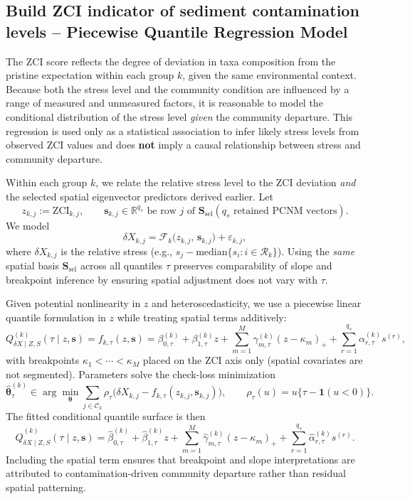 \subsection{Build ZCI indicator of sediment contamination levels – Piecewise Quantile Regression Model}

The $\mathrm{ZCI}$ score reflects the degree of deviation in taxa composition from the pristine expectation within each group $k$, given the same environmental context. 
Because both the stress level and the community condition are influenced by a range of measured and unmeasured factors, it is reasonable to model the conditional distribution of the stress level \emph{given} the community departure.  
This regression is used only as a statistical association to infer likely stress levels from observed $\mathrm{ZCI}$ values and does \textbf{not} imply a causal relationship between stress and community departure.

Within each group \(k\), we relate the relative stress level to the ZCI deviation \emph{and} the selected spatial eigenvector predictors derived earlier. Let
\[
z_{k,j}:=\mathrm{ZCI}_{k,j}, \qquad \mathbf{s}_{k,j}\in\mathbb{R}^{q_s}\text{ be row }j\text{ of }\mathbf{S}_{\text{sel}} (q_s \text{ retained PCNM vectors}).
\]
We model
\[
\delta X_{k,j} = \mathcal{F}_{k}\big(z_{k,j},\,\mathbf{s}_{k,j}\big)+\varepsilon_{k,j},
\]
where $\delta X_{k,j}$ is the relative stress (e.g., $s_j-\mathrm{median}\{s_i:i\in\mathcal{R}_k\}$). Using the \emph{same} spatial basis $\mathbf{S}_{\text{sel}}$ across all quantiles $\tau$ preserves comparability of slope and breakpoint inference by ensuring spatial adjustment does not vary with $\tau$.

Given potential nonlinearity in $z$ and heteroscedasticity, we use a piecewise linear quantile formulation in $z$ while treating spatial terms additively:
\[
Q_{\delta X\mid Z,S}^{(k)}(\tau \mid z, \mathbf{s}) = f_{k,\tau}(z,\mathbf{s}) = \beta_{0,\tau}^{(k)} + \beta_{1,\tau}^{(k)} z + \sum_{m=1}^{M} \gamma_{m,\tau}^{(k)} (z-\kappa_m)_+ + \sum_{r=1}^{q_s} \alpha_{r,\tau}^{(k)} s^{(r)},
\]
with breakpoints $\kappa_1<\cdots<\kappa_M$ placed on the ZCI axis only (spatial covariates are not segmented). Parameters solve the check-loss minimization
\[
\widehat{\boldsymbol{\theta}}_{\tau}^{(k)} \in \arg\min_{\boldsymbol{\theta}} \sum_{j\in\mathcal{C}_k} \rho_{\tau}\Big( \delta X_{k,j} - f_{k,\tau}(z_{k,j},\mathbf{s}_{k,j}) \Big), \qquad \rho_{\tau}(u)=u\{\tau-\mathbf{1}(u<0)\}.
\]
The fitted conditional quantile surface is then
\[
\widehat{Q}_{\delta X\mid Z,S}^{(k)}(\tau \mid z,\mathbf{s}) = \widehat{\beta}_{0,\tau}^{(k)} + \widehat{\beta}_{1,\tau}^{(k)} z + \sum_{m=1}^{M} \widehat{\gamma}_{m,\tau}^{(k)} (z-\kappa_m)_+ + \sum_{r=1}^{q_s} \widehat{\alpha}_{r,\tau}^{(k)} s^{(r)}.
\]
Including the spatial term ensures that breakpoint and slope interpretations are attributed to contamination-driven community departure rather than residual spatial patterning.

